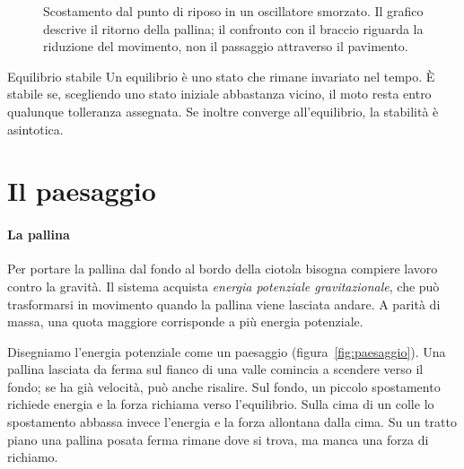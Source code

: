 \documentclass[11pt,a4paper,twoside=false,headinclude,footinclude]{scrartcl}
\begin{document}
\begin{figure}[htbp]
\centering
{}
\caption{Scostamento dal punto di riposo in un oscillatore smorzato. Il grafico descrive il ritorno della pallina; il confronto con il braccio riguarda la riduzione del movimento, non il passaggio attraverso il pavimento.}
\label{fig:onda}
\end{figure}

\begin{parola}{Equilibrio stabile}
Un equilibrio è uno stato che rimane invariato nel tempo. È stabile se, scegliendo uno stato iniziale abbastanza vicino, il moto resta entro qualunque tolleranza assegnata. Se inoltre converge all'equilibrio, la stabilità è asintotica.
\end{parola}

\section{Il paesaggio}\label{sec:paesaggio}

\paragraph{La pallina} Per portare la pallina dal fondo al bordo della ciotola bisogna compiere lavoro contro la gravità. Il sistema acquista \emph{energia potenziale gravitazionale}, che può trasformarsi in movimento quando la pallina viene lasciata andare. A parità di massa, una quota maggiore corrisponde a più energia potenziale.

Disegniamo l'energia potenziale come un paesaggio (figura~\ref{fig:paesaggio}). Una pallina lasciata da ferma sul fianco di una valle comincia a scendere verso il fondo; se ha già velocità, può anche risalire. Sul fondo, un piccolo spostamento richiede energia e la forza richiama verso l'equilibrio. Sulla cima di un colle lo spostamento abbassa invece l'energia e la forza allontana dalla cima. Su un tratto piano una pallina posata ferma rimane dove si trova, ma manca una forza di richiamo.
\end{document}
